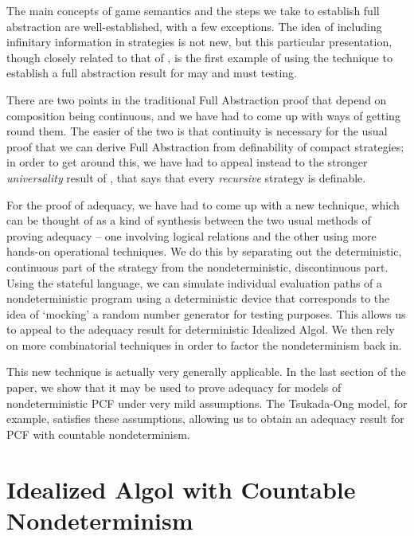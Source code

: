 \documentclass[sigplan,9pt,review]{acmart}\settopmatter{printfolios=true,printccs=false,printacmref=false}
\begin{document}
The main concepts of game semantics and the steps we take to establish full abstraction are well-established, with a few exceptions.  
The idea of including infinitary information in strategies is not new, but this particular presentation, though closely related to that of \cite{LevyGsInfinite}, is the first example of using the technique to establish a full abstraction result for may and must testing.

There are two points in the traditional Full Abstraction proof that depend on composition being continuous, and we have had to come up with ways of getting round them.  
The easier of the two is that continuity is necessary for the usual proof that we can derive Full Abstraction from definability of compact strategies; in order to get around this, we have had to appeal instead to the stronger \emph{universality} result of \cite{hoPcf}, that says that every \emph{recursive} strategy is definable.  

For the proof of adequacy, we have had to come up with a new technique, which can be thought of as a kind of synthesis between the two usual methods of proving adequacy -- one involving logical relations and the other using more hands-on operational techniques.  
We do this by separating out the deterministic, continuous part of the strategy from the nondeterministic, discontinuous part.  
Using the stateful language, we can simulate individual evaluation paths of a nondeterministic program using a deterministic device that corresponds to the idea of `mocking' a random number generator for testing purposes.  
This allows us to appeal to the adequacy result for deterministic Idealized Algol.  
We then rely on more combinatorial techniques in order to factor the nondeterminism back in.

This new technique is actually very generally applicable.  
In the last section of the paper, we show that it may be used to prove adequacy for models of nondeterministic PCF under very mild assumptions.  
The Tsukada-Ong model, for example, satisfies these assumptions, allowing us to obtain an adequacy result for PCF with countable nondeterminism.

\section{Idealized Algol with Countable Nondeterminism}
\end{document}
